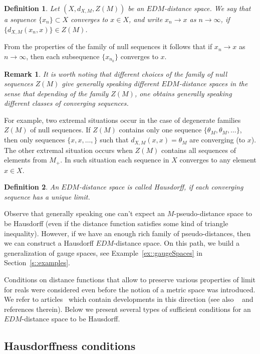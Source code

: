 \documentclass[12pt]{amsart}          %
\newtheorem{definition}{Definition}
\newtheorem{remark}{Remark}
\begin{document}
\begin{definition} 
Let $(X, d_{X,M},Z(M))$
be an $EDM$-distance space. We say that a sequence $\{ x_n\}\subset X$ converges to $x\in X$, and write $x_n\to x$ as $n\to \infty$, if  $\{d_{X,M}(x_n,x)\}\in Z(M)$.
\end{definition}
From the properties of the family of null sequences it follows that if $x_n\to x$ as $n\to \infty$, then each subsequence $\{x_{n_k}\}$ converges to $x$.

\begin{remark}
It is worth noting that different choices of the family of null sequences $Z(M)$ give generally speaking different $EDM$-distance spaces in the sense that depending of the family $Z(M)$, one obtains generally speaking different classes of converging  sequences. 
\end{remark}

{For example, two extremal situations occur in the case of degenerate families $Z(M)$ of null sequences. If $Z(M)$ contains only one sequence $\{\theta_M, \theta_M,\ldots\}$, then only sequences $\{x, x,\ldots,\}$ such that $d_{X,M}(x,x) = \theta_M$ are converging (to $x$). The other extremal situation occurs when $Z(M)$ contains all sequences of elements from $M_+$. In such situation each sequence in $X$ converges to any element $x\in X$.}

\begin{definition}
An $EDM$-distance space is called Hausdorff, if each converging sequence has a unique limit.
\end{definition}
Observe that  generally speaking one can't expect an $M$-pseudo-distance space to be Hausdorff (even if the distance function satisfies some kind of triangle inequality). However, if we have an enough rich family of pseudo-distances, then we can construct a Hausdorff $EDM$-distance space. On this path, we build a generalization of gauge spaces, see Example~\ref{ex::gaugeSpaces} in Section~\ref{s::examples}.

Conditions on distance functions that allow to preserve various properties of limit for reals were considered even before the notion of a metric space was introduced. We refer to articles~\cite{Frechet06,Hildebrandt,Pitcher,Wilson} which contain developments in this direction  (see also ~\cite{Arandelovic,Arandelovichatall} and references therein).
 Below we present several types of sufficient conditions for an $EDM$-distance space to be Hausdorff.


\subsection{Hausdorffness conditions}
\end{document}
